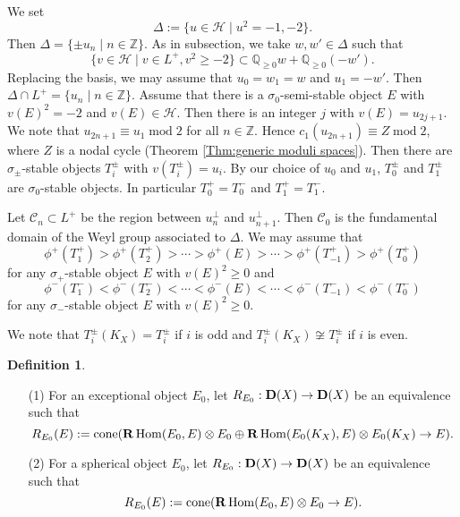 \documentclass[leqno,11pt]{amsart}
\def\Q{\ensuremath{\mathbb{Q}}}
\def\Z{\ensuremath{\mathbb{Z}}}
\def\Hom{\mathop{\mathrm{Hom}}\nolimits}
\def\mod{\mathop{\mathrm{mod}}\nolimits}
\theoremstyle{definition}
\newtheorem{Def}[Thm]{Definition}
\def\Q{\ensuremath{\mathbb{Q}}}
\def\Z{\ensuremath{\mathbb{Z}}}
\def\CC{\ensuremath{\mathcal C}}
\def\HH{\ensuremath{\mathcal H}}
\begin{document}
We set 
\begin{equation}
\Delta:=\{ u \in \HH \mid u^2=-1,-2 \}.
\end{equation}
Then $\Delta=\{\pm u_n \mid n\in \Z \}$.
As in subsection,
we take $w, w' \in \Delta$
such that
$$
\{v \in \HH \mid v \in L^+, v^2 \geq -2 \} \subset
\Q_{\geq 0}w+\Q_{\geq 0}(-w').
$$ 
Replacing the basis, we may assume that $u_0=w_1=w$
and $u_1=-w'$. 
Then $\Delta \cap L^+=\{ u_n \mid n \in \Z \}$.
Assume that there is a $\sigma_0$-semi-stable object $E$ with 
$v(E)^2=-2$ and $v(E) \in \HH$.
Then there is an integer $j$ with
$v(E)=u_{2j+1}$. We note that $u_{2n+1} \equiv u_1 \mod 2$ for all $n \in \Z$.
Hence $c_1(u_{2n+1}) \equiv Z \mod 2$, where
$Z$ is a nodal cycle (Theorem \ref{Thm:generic moduli spaces}).   
Then there are $\sigma_\pm$-stable objects $T_i^\pm$ with
$v(T_i^\pm)=u_i$.
By our choice of $u_0$ and $u_1$,
$T_0^\pm$ and $T_1^\pm$ are $\sigma_0$-stable objects.
In particular
$T_0^+=T_0^-$ and $T_1^+=T_1^-$.


Let $\CC_n \subset L^+$ be the region between 
$u_n^\perp$ and $u_{n+1}^\perp$. 
Then $\CC_0$ is the fundamental domain of the Weyl group associated to
$\Delta$.
We may assume that  
\begin{equation}
\phi^+(T_1^+) > \phi^+(T_2^+)>\cdots>\phi^+(E)>
\cdots >\phi^+(T_{-1}^+)>\phi^+(T_0^+)
\end{equation}
for any $\sigma_+$-stable object $E$ with
$v(E)^2 \geq 0$
and
\begin{equation}
\phi^-(T_1^-) < \phi^-(T_2^-)<\cdots<\phi^-(E)<
\cdots <\phi^-(T_{-1}^-)<\phi^-(T_0^-)
\end{equation}
for any $\sigma_-$-stable object $E$ with
$v(E)^2 \geq 0$.

We note that $T_i^\pm (K_X)=T_i^\pm$ if $i$ is odd and
$T_i^\pm (K_X) \not \cong T_i^\pm$ if $i$ is even.

\begin{Def}
\begin{enumerate}
\item[(1)]
For an exceptional object $E_0$,
let $R_{E_0}:{\bf D}(X) \to {\bf D}(X)$ be an equivalence such that
\begin{equation}
R_{E_0}(E):=
\mathrm{cone}({\bf R}\Hom(E_0,E)\otimes E_0 \oplus 
 {\bf R}\Hom(E_0(K_X),E)\otimes E_0(K_X) \to E).
\end{equation}
\item[(2)]
For a spherical object $E_0$,
let $R_{E_0}:{\bf D}(X) \to {\bf D}(X)$ be an equivalence such that
\begin{equation}
R_{E_0}(E):=\mathrm{cone}({\bf R}\Hom(E_0,E)\otimes E_0  \to E).
\end{equation}
\end{enumerate}
\end{Def}
\end{document}
